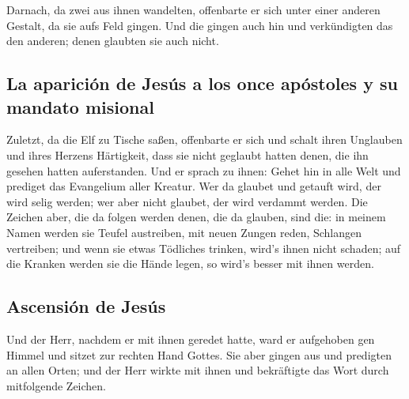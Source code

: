  Darnach, da zwei aus ihnen wandelten, offenbarte er sich
unter einer anderen Gestalt, da sie aufs Feld gingen. 
Und die gingen auch hin und verkündigten das den anderen; denen glaubten
sie auch nicht.

\hypertarget{la-apariciuxf3n-de-jesuxfas-a-los-once-apuxf3stoles-y-su-mandato-misional}{%
\subsection{La aparición de Jesús a los once apóstoles y su mandato
misional}\label{la-apariciuxf3n-de-jesuxfas-a-los-once-apuxf3stoles-y-su-mandato-misional}}

 Zuletzt, da die Elf zu Tische saßen, offenbarte er sich
und schalt ihren Unglauben und ihres Herzens Härtigkeit, dass sie nicht
geglaubt hatten denen, die ihn gesehen hatten auferstanden.
 Und er sprach zu ihnen: Gehet hin in alle Welt und
prediget das Evangelium aller Kreatur.  Wer da glaubet
und getauft wird, der wird selig werden; wer aber nicht glaubet, der
wird verdammt werden.  Die Zeichen aber, die da folgen
werden denen, die da glauben, sind die: in meinem Namen werden sie
Teufel austreiben, mit neuen Zungen reden,  Schlangen
vertreiben; und wenn sie etwas Tödliches trinken, wird's ihnen nicht
schaden; auf die Kranken werden sie die Hände legen, so wird's besser
mit ihnen werden.

\hypertarget{ascensiuxf3n-de-jesuxfas}{%
\subsection{Ascensión de Jesús}\label{ascensiuxf3n-de-jesuxfas}}

 Und der Herr, nachdem er mit ihnen geredet hatte, ward
er aufgehoben gen Himmel und sitzet zur rechten Hand Gottes.
 Sie aber gingen aus und predigten an allen Orten; und
der Herr wirkte mit ihnen und bekräftigte das Wort durch mitfolgende
Zeichen.
